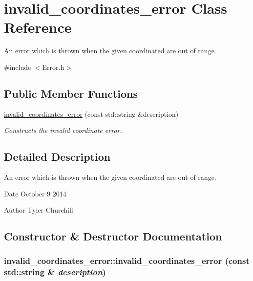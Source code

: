 \hypertarget{classinvalid__coordinates__error}{
\section{invalid\_\-coordinates\_\-error Class Reference}
\label{classinvalid__coordinates__error}
}


An error which is thrown when the given coordinated are out of range.  


{\ttfamily \#include $<$Error.h$>$}\subsection*{Public Member Functions}
\begin{DoxyCompactItemize}
\item 
\hyperlink{classinvalid__coordinates__error_aa95c714d67acd9d2a5307422408a647f}{invalid\_\-coordinates\_\-error} (const std::string \&description)
\begin{DoxyCompactList}\small\item\em Constructs the invalid coordinate error. \item\end{DoxyCompactList}\end{DoxyCompactItemize}


\subsection{Detailed Description}
An error which is thrown when the given coordinated are out of range. \begin{DoxyDate}{Date}
October 9 2014 
\end{DoxyDate}
\begin{DoxyAuthor}{Author}
Tyler Churchill 
\end{DoxyAuthor}


\subsection{Constructor \& Destructor Documentation}
\hypertarget{classinvalid__coordinates__error_aa95c714d67acd9d2a5307422408a647f}{
\subsubsection[{invalid\_\-coordinates\_\-error}]{\setlength{\rightskip}{0pt plus 5cm}invalid\_\-coordinates\_\-error::invalid\_\-coordinates\_\-error (const std::string \& {\em description})}}
\label{classinvalid__coordinates__error_aa95c714d67acd9d2a5307422408a647f}


